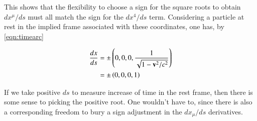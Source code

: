 This shows that the flexibility to choose a sign for the square roots to obtain $dx^\mu/ds$ must all match the sign for the $dx^4/ds$ term.  Considering a particle at rest in the implied frame associated with these coordinates, one has, by \ref{eqn:timearc}

\begin{align*}
\frac{dx}{ds} 
&= \pm \left(0, 0, 0, \frac{1}{\sqrt{1 - \mathbf{v}^2/c^2}} \right) \\
&= \pm \left(0, 0, 0, 1 \right) \\
\end{align*}

If we take positive $ds$ to measure increase of time in the rest frame, then there is some sense to picking the positive root.  One
wouldn't have to, since there is also a corresponding freedom to bury a sign adjustment in the $dx_\mu/ds$ derivatives.

%
%

%
